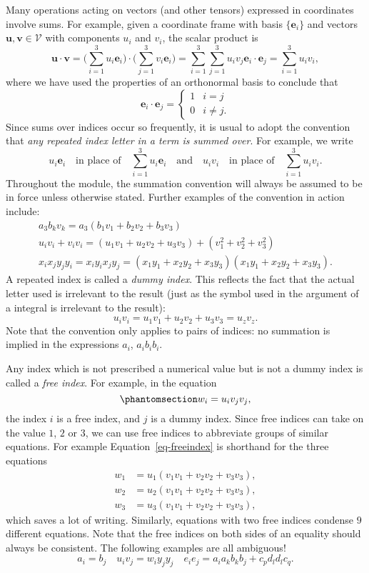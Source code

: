\documentclass[
  letterpaper,
  DIV=11,
  numbers=noendperiod]{scrreprt}
\theoremstyle{plain}
\theoremstyle{remark}
\begin{document}
Many operations acting on vectors (and other tensors) expressed in
coordinates involve sums. For example, given a coordinate frame with
basis \(\{{\boldsymbol{e}}_i\}\) and vectors
\({\boldsymbol{u}},{\boldsymbol{v}}\in{\mathcal{V}}\) with components
\(u_i\) and \(v_i\), the scalar product is
\[{\boldsymbol{u}}\cdot{\boldsymbol{v}}= \bigg(\sum_{i=1}^3u_i{\boldsymbol{e}}_i\bigg)\cdot\bigg(\sum_{j=1}^3 v_i{\boldsymbol{e}}_i\bigg) = \sum_{i=1}^3\sum_{j=1}^3 u_iv_j{\boldsymbol{e}}_i\cdot{\boldsymbol{e}}_j = \sum_{i=1}^3 u_iv_i,\]
where we have used the properties of an orthonormal basis to conclude
that \[{\boldsymbol{e}}_i\cdot{\boldsymbol{e}}_j = \begin{cases}
    1 & i=j\\
    0 &i\neq j.
  \end{cases}\] Since sums over indices occur so frequently, it is usual
to adopt the convention that \emph{any repeated index letter in a term
is summed over}. For example, we write
\[u_i{\boldsymbol{e}}_i\quad\text{in place of}\quad \sum_{i=1}^3 u_i{\boldsymbol{e}}_i\quad\text{and}\quad u_iv_i\quad\text{in place of}\quad\sum_{i=1}^3u_iv_i.\]
Throughout the module, the summation convention will always be assumed
to be in force unless otherwise stated. Further examples of the
convention in action include: \[\begin{gathered}
  a_3b_kv_k = a_3(b_1v_1+b_2v_2+b_3v_3)\\
  u_iv_i+v_iv_i = (u_1v_1+u_2v_2+u_3v_3)+(v_1^2+v_2^2+v_3^2)\\
  x_ix_jy_jy_i = x_iy_ix_jy_j = (x_1y_1+x_2y_2+x_3y_3)(x_1y_1+x_2y_2+x_3y_3).
\end{gathered}\] A repeated index is called a \emph{dummy index}. This
reflects the fact that the actual letter used is irrelevant to the
result (just as the symbol used in the argument of a integral is
irrelevant to the result): \[u_iv_i = u_1v_1+u_2v_2+u_3v_3 = u_zv_z.\]
Note that the convention only applies to pairs of indices: no summation
is implied in the expressions \(a_i\), \(a_ib_ib_i\).

Any index which is not prescribed a numerical value but is not a dummy
index is called a \emph{free index}. For example, in the equation
\begin{equation}\phantomsection\label{eq-freeindex}{
  w_i = u_iv_jv_j,
}\end{equation} the index \(i\) is a free index, and \(j\) is a dummy
index. Since free indices can take on the value \(1\), \(2\) or \(3\),
we can use free indices to abbreviate groups of similar equations. For
example Equation~\ref{eq-freeindex} is shorthand for the three equations
\[\begin{aligned}
  w_1 &= u_1(v_1v_1+v_2v_2+v_3v_3),\\
  w_2 &= u_2(v_1v_1+v_2v_2+v_3v_3),\\
  w_3 &= u_3(v_1v_1+v_2v_2+v_3v_3),
\end{aligned}\] which saves a lot of writing. Similarly, equations with
two free indices condense \(9\) different equations. Note that the free
indices on both sides of an equality should always be consistent. The
following examples are all ambiguous!
\[a_i = b_j\quad u_iv_j = w_iy_jy_j\quad e_ie_j = a_ia_kb_kb_j+c_pd_ld_lc_q.\]
\end{document}
